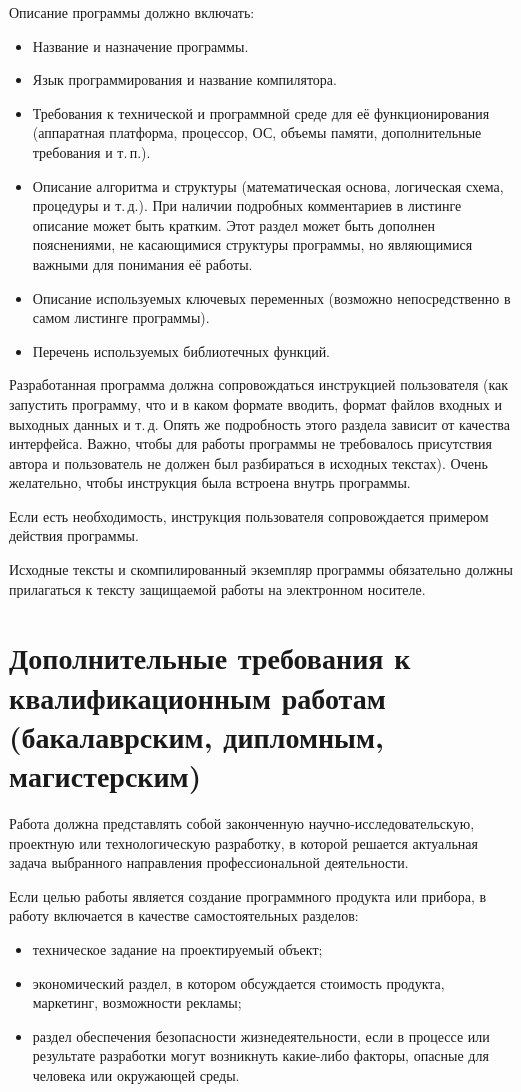 \documentclass[utf8,14pt, coursreport]{G7-32}
\begin{document}
Описание программы должно включать:
\begin{itemize}
\item Название и назначение программы.
\item Язык программирования и название компилятора.
\item Требования к технической и программной среде для её функционирования (аппаратная платформа, процессор, ОС, объемы памяти, дополнительные требования и т.\,п.).
\item Описание алгоритма и структуры (математическая основа, логическая схема, процедуры и т.\,д.). При наличии подробных комментариев в листинге описание может быть кратким. Этот раздел может быть дополнен пояснениями, не касающимися структуры программы, но являющимися важными для понимания её работы.
\item Описание используемых ключевых переменных (возможно непосредственно в самом листинге программы).
\item Перечень используемых библиотечных функций.
\end{itemize}

Разработанная программа должна сопровождаться инструкцией пользователя (как запустить программу, что и в каком формате вводить, формат файлов входных и выходных данных и т.\,д. Опять же подробность этого раздела зависит от качества интерфейса. Важно, чтобы для работы программы не требовалось присутствия автора и пользователь не должен был разбираться в исходных текстах). Очень желательно, чтобы инструкция была встроена внутрь программы.

Если есть необходимость, инструкция пользователя сопровождается примером действия программы.

Исходные тексты и скомпилированный экземпляр программы обязательно должны прилагаться к тексту защищаемой работы на электронном носителе. 

\chapter{Дополнительные требования к квалификационным работам
(бакалаврским, дипломным, магистерским)}

Работа должна представлять собой законченную научно-исследовательскую, проектную или технологическую разработку, в которой решается актуальная задача выбранного направления профессиональной деятельности.

Если целью работы является создание программного продукта или прибора, в работу включается в качестве самостоятельных разделов:
\begin{itemize}
\item техническое задание на проектируемый объект;
\item экономический раздел, в котором обсуждается стоимость продукта, маркетинг, возможности рекламы;
\item раздел обеспечения безопасности жизнедеятельности, если в процессе или результате разработки могут возникнуть какие-либо факторы, опасные для человека или окружающей среды.
\end{itemize}
\end{document}
